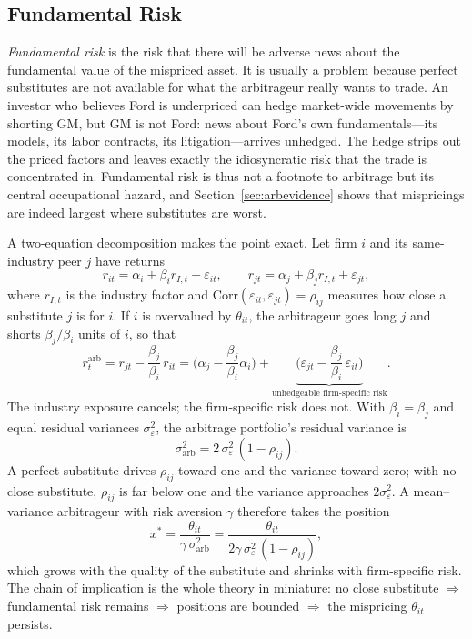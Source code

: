 \subsection{Fundamental Risk}

\emph{Fundamental risk} is the risk that there will be adverse news about the fundamental value of the mispriced asset. It is usually a problem because perfect substitutes are not available for what the arbitrageur really wants to trade. An investor who believes Ford is underpriced can hedge market-wide movements by shorting GM, but GM is not Ford: news about Ford's own fundamentals---its models, its labor contracts, its litigation---arrives unhedged. The hedge strips out the priced factors and leaves exactly the idiosyncratic risk that the trade is concentrated in. Fundamental risk is thus not a footnote to arbitrage but its central occupational hazard, and Section~\ref{sec:arbevidence} shows that mispricings are indeed largest where substitutes are worst.

A two-equation decomposition makes the point exact. Let firm $i$ and its same-industry peer $j$ have returns
\[
r_{it} = \alpha_i + \beta_i r_{I,t} + \varepsilon_{it},
\qquad
r_{jt} = \alpha_j + \beta_j r_{I,t} + \varepsilon_{jt},
\]
where $r_{I,t}$ is the industry factor and $\mathrm{Corr}(\varepsilon_{it},\varepsilon_{jt}) = \rho_{ij}$ measures how close a substitute $j$ is for $i$. If $i$ is overvalued by $\theta_{it}$, the arbitrageur goes long $j$ and shorts $\beta_j/\beta_i$ units of $i$, so that
\[
r^{\mathrm{arb}}_t
= r_{jt} - \frac{\beta_j}{\beta_i}\, r_{it}
= \Big(\alpha_j - \frac{\beta_j}{\beta_i}\alpha_i\Big)
+ \underbrace{\Big(\varepsilon_{jt} - \frac{\beta_j}{\beta_i}\,\varepsilon_{it}\Big)}_{\text{unhedgeable firm-specific risk}} .
\]
The industry exposure cancels; the firm-specific risk does not. With $\beta_i = \beta_j$ and equal residual variances $\sigma_\varepsilon^2$, the arbitrage portfolio's residual variance is
\[
\sigma^2_{\mathrm{arb}} = 2\,\sigma_\varepsilon^2\,(1-\rho_{ij}).
\]
A perfect substitute drives $\rho_{ij}$ toward one and the variance toward zero; with no close substitute, $\rho_{ij}$ is far below one and the variance approaches $2\sigma_\varepsilon^2$. A mean--variance arbitrageur with risk aversion $\gamma$ therefore takes the position
\[
x^{*} = \frac{\theta_{it}}{\gamma\,\sigma^2_{\mathrm{arb}}}
= \frac{\theta_{it}}{2\gamma\,\sigma_\varepsilon^2\,(1-\rho_{ij})},
\]
which grows with the quality of the substitute and shrinks with firm-specific risk. The chain of implication is the whole theory in miniature: no close substitute $\Rightarrow$ fundamental risk remains $\Rightarrow$ positions are bounded $\Rightarrow$ the mispricing $\theta_{it}$ persists.

